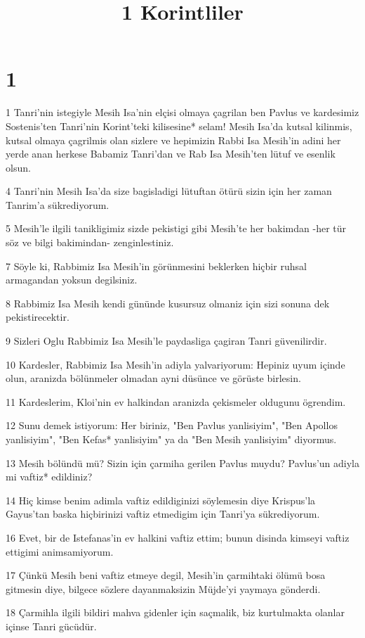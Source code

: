

\title{1 Korintliler}


\chapter{1}

\par 1 Tanri'nin istegiyle Mesih Isa'nin elçisi olmaya çagrilan ben Pavlus ve kardesimiz Sostenis'ten Tanri'nin Korint'teki kilisesine* selam! Mesih Isa'da kutsal kilinmis, kutsal olmaya çagrilmis olan sizlere ve hepimizin Rabbi Isa Mesih'in adini her yerde anan herkese Babamiz Tanri'dan ve Rab Isa Mesih'ten lütuf ve esenlik olsun.
\par 4 Tanri'nin Mesih Isa'da size bagisladigi lütuftan ötürü sizin için her zaman Tanrim'a sükrediyorum.
\par 5 Mesih'le ilgili tanikligimiz sizde pekistigi gibi Mesih'te her bakimdan -her tür söz ve bilgi bakimindan- zenginlestiniz.
\par 7 Söyle ki, Rabbimiz Isa Mesih'in görünmesini beklerken hiçbir ruhsal armagandan yoksun degilsiniz.
\par 8 Rabbimiz Isa Mesih kendi gününde kusursuz olmaniz için sizi sonuna dek pekistirecektir.
\par 9 Sizleri Oglu Rabbimiz Isa Mesih'le paydasliga çagiran Tanri güvenilirdir.
\par 10 Kardesler, Rabbimiz Isa Mesih'in adiyla yalvariyorum: Hepiniz uyum içinde olun, aranizda bölünmeler olmadan ayni düsünce ve görüste birlesin.
\par 11 Kardeslerim, Kloi'nin ev halkindan aranizda çekismeler oldugunu ögrendim.
\par 12 Sunu demek istiyorum: Her biriniz, "Ben Pavlus yanlisiyim", "Ben Apollos yanlisiyim", "Ben Kefas* yanlisiyim" ya da "Ben Mesih yanlisiyim" diyormus.
\par 13 Mesih bölündü mü? Sizin için çarmiha gerilen Pavlus muydu? Pavlus'un adiyla mi vaftiz* edildiniz?
\par 14 Hiç kimse benim adimla vaftiz edildiginizi söylemesin diye Krispus'la Gayus'tan baska hiçbirinizi vaftiz etmedigim için Tanri'ya sükrediyorum.
\par 16 Evet, bir de Istefanas'in ev halkini vaftiz ettim; bunun disinda kimseyi vaftiz ettigimi animsamiyorum.
\par 17 Çünkü Mesih beni vaftiz etmeye degil, Mesih'in çarmihtaki ölümü bosa gitmesin diye, bilgece sözlere dayanmaksizin Müjde'yi yaymaya gönderdi.
\par 18 Çarmihla ilgili bildiri mahva gidenler için saçmalik, biz kurtulmakta olanlar içinse Tanri gücüdür.

